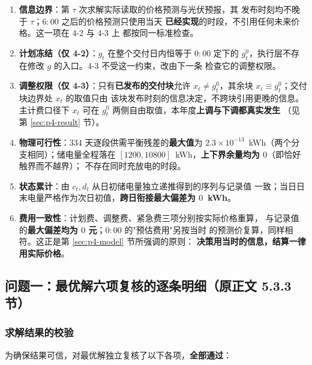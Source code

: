 \begin{enumerate}
  \item \textbf{信息边界}：第 $\tau$ 次求解实际读取的价格预测与光伏预报，其
        发布时刻均不晚于 $\tau$；$6{:}00$ 之后的价格预测只使用当天
        \textbf{已经实现}的时段，不引用任何未来价格。这一项在 4-2 与 4-3 上
        都按同一标准检查。
  \item \textbf{计划冻结（仅 4-2）}：$g_t$ 在整个交付日内恒等于 $0{:}00$ 定下的
        $g_t^0$，执行层不存在修改 $g$ 的入口。4-3 不受这一约束，改由下一条
        检查它的调整权限。
  \item \textbf{调整权限（仅 4-3）}：只有\textbf{已发布的交付块}允许
        $x_t\neq g_t^0$，其余块 $x_t\equiv g_t^0$；交付块边界处 $x_t$ 的取值只由
        该块发布时刻的信息决定，不跨块引用更晚的信息。主计费口径下 $x_t$ 可在
        $g_t^0$ 两侧自由取值，本年度\textbf{上调与下调都真实发生}
        （见第 \ref{sec:p4-result} 节）。
  \item \textbf{物理可行性}：$334$ 天逐段供需平衡残差的\textbf{最大值}为
        $2.3\times10^{-13}$~kWh（两个分支相同）；储电量全程落在
        $[1200,10800]$~kWh，\textbf{上下界余量均为 $0$}（即恰好触界而不越界）；
        不存在同时充放电的时段。
  \item \textbf{状态累计}：由 $c_t,d_t$ 从日初储电量独立递推得到的序列与记录值
        一致；当日日末电量严格作为次日初值，\textbf{跨日衔接最大偏差为
        $0$~kWh}。
  \item \textbf{费用一致性}：计划费、调整费、紧急费三项分别按实际价格重算，
        与记录值的\textbf{最大偏差均为 $0$ 元}；$0{:}00$ 的"预估费用"另按当时
        的预测价复算，同样相符。这正是第 \ref{sec:p4-model} 节所强调的原则：
        \textbf{决策用当时的信息，结算一律用实际价格}。
\end{enumerate}


\subsection{问题一：最优解六项复核的逐条明细（原正文 5.3.3 节）}
\label{app:p1-checks}

\subsubsection{求解结果的校验}

为确保结果可信，对最优解独立复核了以下各项，\textbf{全部通过}：

